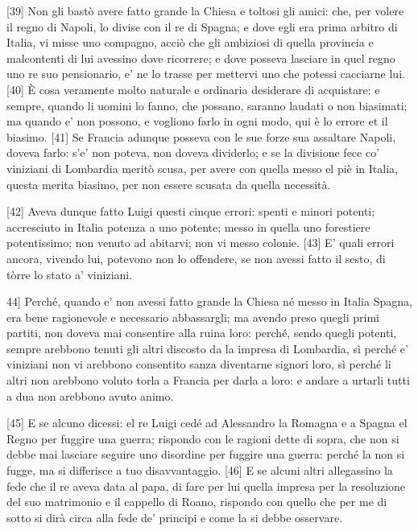 {[}39{]} Non gli bastò avere fatto grande la Chiesa e toltosi gli amici:
che, per volere il regno di Napoli, lo divise con il re di Spagna; e
dove egli era prima arbitro di Italia, vi misse uno compagno, acciò che
gli ambiziosi di quella provincia e malcontenti di lui avessino dove
ricorrere; e dove posseva lasciare in quel regno uno re suo pensionario,
e' ne lo trasse per mettervi uno che potessi cacciarne lui. {[}40{]} È
cosa veramente molto naturale e ordinaria desiderare di acquistare: e
sempre, quando li uomini lo fanno, che possano, saranno laudati o non
biasimati; ma quando e' non possono, e vogliono farlo in ogni modo, qui
è lo errore et il biasimo. {[}41{]} Se Francia adunque posseva con le
sue forze sua assaltare Napoli, doveva farlo: s'e' non poteva, non
doveva dividerlo; e se la divisione fece co' viniziani di Lombardia
meritò scusa, per avere con quella messo el piè in Italia, questa merita
biasimo, per non essere scusata da quella necessità.

{[}42{]} Aveva dunque fatto Luigi questi cinque errori: spenti e minori
potenti; accresciuto in Italia potenza a uno potente; messo in quella
uno forestiere potentissimo; non venuto ad abitarvi; non vi messo
colonie. {[}43{]} E' quali errori ancora, vivendo lui, potevono non lo
offendere, se non avessi fatto il sesto, di tòrre lo stato a' viniziani.

\quebra

\noindent{}{[}44{]} Perché, quando e' non avessi fatto grande la Chiesa né messo in
Italia Spagna, era bene ragionevole e necessario abbassargli; ma avendo
preso quegli primi partiti, non doveva mai consentire alla ruina loro:
perché, sendo quegli potenti, sempre arebbono tenuti gli altri discosto
da la impresa di Lombardia, sì perché e' viniziani non vi arebbono
consentito sanza diventarne signori loro, sì perché li altri non
arebbono voluto torla a Francia per darla a loro: e andare a urtarli
tutti a dua non arebbono avuto animo.

{[}45{]} E se alcuno dicessi: el re Luigi cedé ad Alessandro la Romagna
e a Spagna el Regno per fuggire una guerra; rispondo con le ragioni
dette di sopra, che non si debbe mai lasciare seguire uno disordine per
fuggire una guerra: perché la non si fugge, ma si differisce a tuo
disavvantaggio. {[}46{]} E se alcuni altri allegassino la fede che il re
aveva data al papa, di fare per lui quella impresa per la resoluzione
del suo matrimonio e il cappello di Roano, rispondo con quello che per
me di sotto si dirà circa alla fede de' principi e come la si debbe
osservare.

